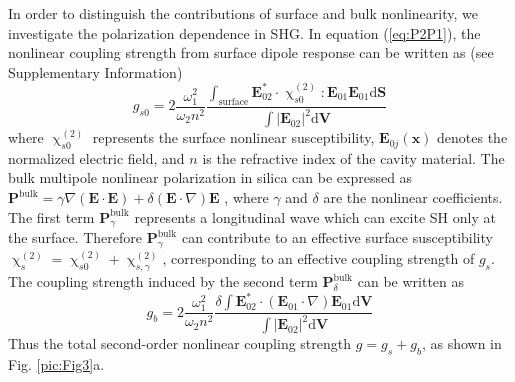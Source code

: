 \documentclass[a4paper,8pt,hyperref, twocolumn, aps, prl]{article}
\begin{document}
In order to distinguish the contributions of surface and bulk nonlinearity, we investigate the polarization dependence in SHG.  
In equation (\ref{eq:P2P1}), the nonlinear coupling strength from surface dipole response can be written as (see Supplementary Information)
\begin{equation}
g_{s0} = 2\frac{\omega_1^2}{\omega_2n^2}\frac{\int_{\mathrm{surface} } \mathbf{E}_{02}^* \cdot \upchi^{(2)}_{s0}:\mathbf{E}_{01}\mathbf{E}_{01} \mathrm{d}	\mathbf{S}}{\int |\mathbf{E}_{02}|^2 \mathrm{d}	\mathbf{V}}
\end{equation}
where $\upchi^{(2)}_{s0}$ represents the surface nonlinear susceptibility, $\mathbf{E}_{0j}(\mathbf{x})$ denotes the  normalized electric field, and $n$ is the refractive index of the cavity material. 
The bulk multipole nonlinear polarization in silica can be expressed as $\mathbf{P}^{\mathrm{bulk}} =  \gamma\nabla(\mathbf{E}\cdot\mathbf{E})+\delta(\mathbf{E}\cdot\nabla)\mathbf{E}$ \cite{bloembergen1968optical}, where $\gamma$ and $\delta$ are the nonlinear coefficients. The first term $\mathbf{P}^{\mathrm{bulk}}_\gamma$ represents a longitudinal wave which can excite SH only at the surface. Therefore $\mathbf{P}^{\mathrm{bulk}}_\gamma$ can contribute to an effective surface susceptibility\cite{heinz1991second} $\upchi^{(2)}_s = \upchi^{(2)}_{s0}+\upchi^{(2)}_{s,\gamma}$, corresponding to an effective coupling strength of $g_s$. The coupling strength induced by the second term $\mathbf{P}^{\mathrm{bulk}}_\delta$ can be written as 
\begin{equation}
g_b =  2\frac{\omega_1^2}{\omega_2n^2}\frac{\delta \int \mathbf{E}_{02}^* \cdot (\mathbf{E}_{01}\cdot\nabla)\mathbf{E}_{01} \mathrm{d}	\mathbf{V}}{\int |\mathbf{E}_{02}|^2 \mathrm{d} \mathbf{V}}
\label{eq:gb}
\end{equation}
Thus the total second-order nonlinear coupling strength $g = g_s+g_b$, as shown in Fig. \ref{pic:Fig3}a.
\end{document}
